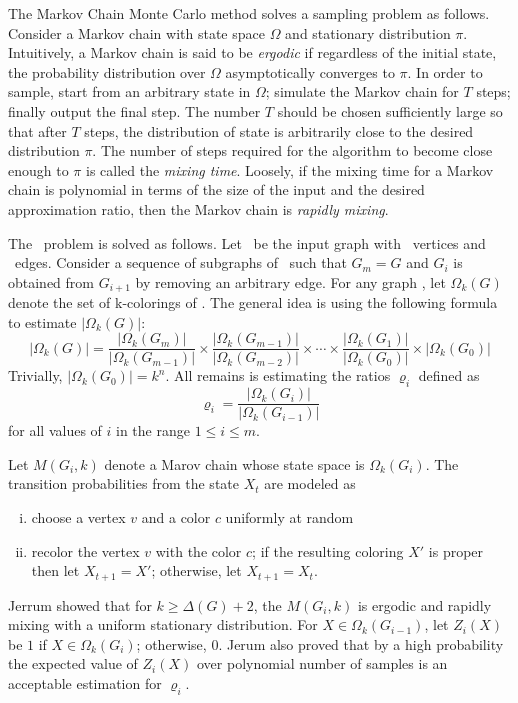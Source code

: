 The Markov Chain Monte Carlo method solves a sampling problem as follows.
Consider a Markov chain with state space \(\Omega\) and stationary distribution \(\pi\)\@.
Intuitively, a Markov chain is said to be \emph{ergodic} if regardless of the initial state,
the probability distribution over \(\Omega\) asymptotically converges to \(\pi\)\@.
In order to sample, start from an arbitrary state in \(\Omega\); simulate the
Markov chain for \(T\) steps; finally output the final step.
The number \(T\) should be chosen sufficiently large so that after \(T\) steps,
the distribution of state
is arbitrarily close to the desired distribution \(\pi\)\@. The number of steps required
for the algorithm to become close enough to \(\pi\) is called the \emph{mixing time}\@.
Loosely, if the mixing time for a Markov chain is polynomial in terms of the size of the input
and the desired approximation ratio, then the Markov chain is \emph{rapidly mixing}\@.

The \ldkcol\ problem is solved as follows.
Let \mG\ be the input graph with \mn\ vertices
and \mm\ edges. Consider a sequence of subgraphs of \mG\ such that 
\(G_m=G\) and \(G_i\) is obtained from \(G_{i+1}\) by removing an arbitrary edge.
For any graph \mG, let \(\Omega_k(G)\) denote the set of k-colorings of \mG\@.
The general idea is using the following formula to estimate \(|\Omega_k(G)|\):
\[ |\Omega_k(G)| = 
\frac{|\Omega_k(G_m)|}{|\Omega_k(G_{m-1})|} \times 
\frac{|\Omega_k(G_{m-1})|}{|\Omega_k(G_{m-2})|} \times 
\dotsb \times
\frac{|\Omega_k(G_1)|}{|\Omega_k(G_0)|} \times 
|\Omega_k(G_0)|
\]
Trivially, \(|\Omega_k(G_0)| = k^n\)\@. All remains is estimating the ratios \(\varrho_i\) defined as
\[\varrho_i=\frac{|\Omega_k(G_i)|}{|\Omega_k(G_{i-1})|}\]
for all values of \(i\) in the range \(1\le i \le m\)\@.

Let \(M(G_i, k)\) denote a Marov chain whose state space is \(\Omega_k(G_i)\)\@. The transition probabilities from the state \(X_t\) are modeled as 
\begin{enumerate}[i)]
\item choose a vertex \(v\) and a color \(c\) uniformly at random
\item recolor the vertex \(v\) with the color \(c\); if the resulting coloring \(X'\)
is proper then let \(X_{t+1}=X'\); otherwise, let \(X_{t+1}=X_t\)\@.
\end{enumerate}

Jerrum \cite{Jerrum} showed that for \(k \ge \Delta(G) + 2\), the \(M(G_i,k)\) is ergodic and 
rapidly mixing with a uniform stationary distribution. For \(X\in \Omega_k(G_{i-1})\),
let \(Z_i(X)\) be \(1\) if \(X\in \Omega_k(G_i)\); otherwise, \(0\)\@.
Jerum also proved that by a high probability the expected value of 
\(Z_i(X)\) over polynomial number of samples is an
acceptable estimation for \(\varrho_i\)\@.

